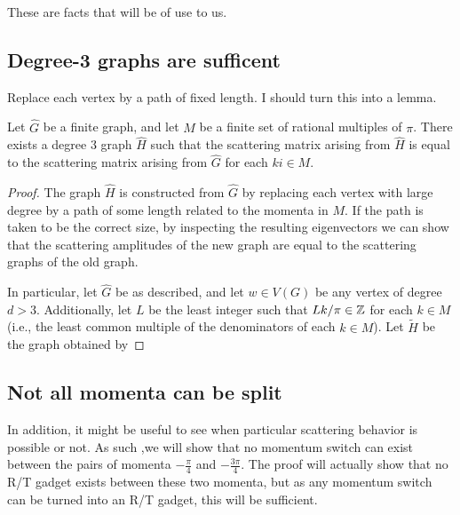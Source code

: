\documentclass[../thesis-main/thesis-main]{subfiles}
\begin{document}
These are facts that will be of use to us.

\subsection{Degree-3 graphs are sufficent}

Replace each vertex by a path of fixed length.  I should turn this into a lemma.

\begin{lemma} Let $\widehat{G}$ be a finite graph, and let $M$ be a finite set of rational multiples of $\pi$.  There exists a degree 3 graph $\widehat{H}$ such that the scattering matrix arising from $\widehat{H}$ is equal to the scattering matrix arising from $\widehat{G}$ for each $ki\in M$.
\end{lemma}
\begin{proof}
  The graph $\widehat{H}$ is constructed from $\widehat{G}$ by replacing each vertex with large degree by a path of some length related to the momenta in $M$.  If the path is taken to be the correct size, by inspecting the resulting eigenvectors we can show that the scattering amplitudes of the new graph are equal to the scattering graphs of the old graph.
  
  In particular, let $\widehat{G}$ be as described, and let $w\in V(G)$ be any vertex of degree $d>3$.  Additionally, let $L$ be the least integer such that $Lk/\pi \in \mathbb{Z}$ for each $k\in M$ (i.e., the least common multiple of the denominators of each $k\in M$).  Let $\widetilde{H}$ be the graph obtained by 
  
\end{proof}


\subsection{Not all momenta can be split}

In addition, it might be useful to see when particular scattering behavior is possible or not.  As such ,we will show that no momentum switch can exist between the pairs of momenta $-\frac{\pi}{4}$ and $-\frac{3\pi}{4}$.  The proof will actually show that no R/T gadget exists between these two momenta, but as any momentum switch can be turned into an R/T gadget, this will be sufficient.

\end{document}
